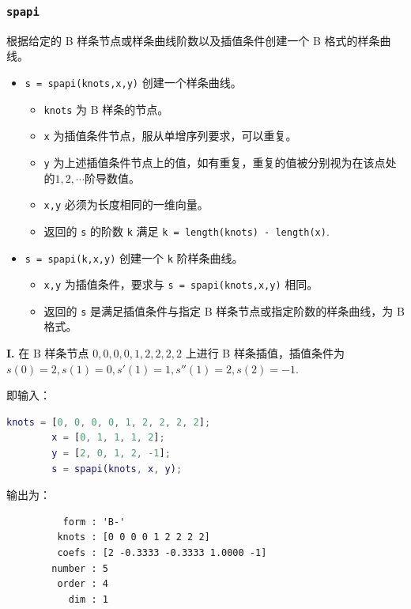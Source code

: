 \subsubsection{\texttt{spapi}}

根据给定的 B 样条节点或样条曲线阶数以及插值条件创建一个 B 格式的样条曲线。

\begin{itemize}
    \item \texttt{s = spapi(knots,x,y)} 创建一个样条曲线。
          \begin{itemize}
              \item \texttt{knots} 为 B 样条的节点。
              \item \texttt{x} 为插值条件节点，服从单增序列要求，可以重复。
              \item \texttt{y} 为上述插值条件节点上的值，如有重复，重复的值被分别视为在该点处的$1, 2, \cdots$阶导数值。
              \item \texttt{x,y} 必须为长度相同的一维向量。
              \item 返回的 \texttt{s} 的阶数 \texttt{k} 满足 \texttt{k = length(knots) - length(x)}.
          \end{itemize}
    \item \texttt{s = spapi(k,x,y)} 创建一个 \texttt{k} 阶样条曲线。
          \begin{itemize}
              \item \texttt{x,y} 为插值条件，要求与 \texttt{s = spapi(knots,x,y)} 相同。
              \item 返回的 \texttt{s} 是满足插值条件与指定 B 样条节点或指定阶数的样条曲线，为 B 格式。
          \end{itemize}
\end{itemize}

\textbf{I.} 在 B 样条节点 ${0, 0, 0, 0, 1, 2, 2, 2, 2}$ 上进行 B 样条插值，插值条件为 $s(0)=2,s(1) = 0,s'(1) = 1,s''(1) = 2,s(2) = −1.$

即输入：

\begin{lstlisting}[language=matlab]
        knots = [0, 0, 0, 0, 1, 2, 2, 2, 2];
        x = [0, 1, 1, 1, 2];
        y = [2, 0, 1, 2, -1];
        s = spapi(knots, x, y);
\end{lstlisting}

输出为：

\begin{lstlisting}
          form : 'B-'
         knots : [0 0 0 0 1 2 2 2 2]
         coefs : [2 -0.3333 -0.3333 1.0000 -1]
        number : 5
         order : 4
           dim : 1
\end{lstlisting}

